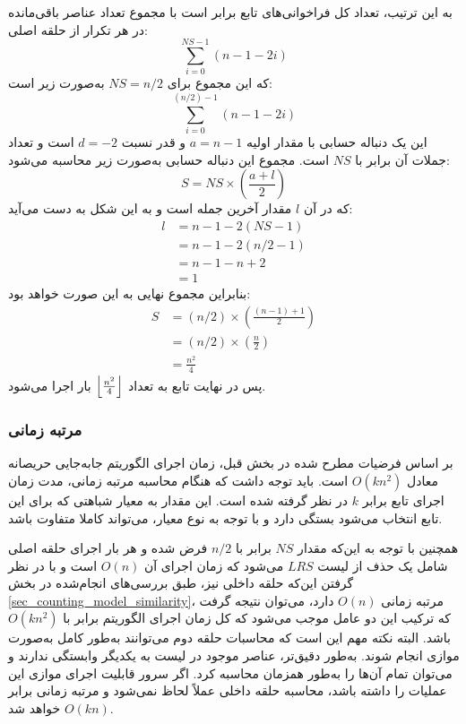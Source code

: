 به این ترتیب، تعداد کل فراخوانی‌های تابع
برابر است با مجموع تعداد عناصر باقی‌مانده در هر تکرار از حلقه اصلی:
\begin{equation}
	\sum_{i=0}^{NS-1} (n-1-2i)
\end{equation}
که این مجموع برای \( NS=n/2 \) به‌صورت زیر است:
\begin{equation}
	\sum_{i=0}^{(n/2)-1} (n-1-2i)
\end{equation}
این یک دنباله حسابی با مقدار اولیه \(a=n-1\) و قدر نسبت
 \(d=-2\) 
است و تعداد جملات آن برابر با \( NS \) است.
مجموع این دنباله حسابی به‌صورت زیر محاسبه می‌شود:
\begin{equation}
	S = NS \times \left( \frac{a+l}{2} \right)
\end{equation}
که در آن \( l \) مقدار آخرین جمله است و به این شکل به دست می‌آید:
\begin{equation}
	\begin{align*} 
		l &= n-1-2(NS-1) \\
		  &= n-1-2(n/2-1) \\
		  &= n-1-n+2 \\
		  &= 1
	\end{align*}
\end{equation}
بنابراین مجموع نهایی به این صورت خواهد بود:
\begin{equation}
	\begin{align*} 
		S &= (n/2) \times \left( \frac{(n-1)+1}{2} \right) \\
		&= (n/2) \times \left( \frac{n}{2} \right) \\
		&= \frac{n^2}{4}
	\end{align*}
\end{equation}
پس در نهایت تابع
به تعداد
\(
\left \lfloor \frac{n^2}{4} \right \rfloor
 \) 
بار اجرا می‌شود.

\vspace{3mm}
\subsubsection{مرتبه زمانی}\vspace{-1mm}\label{order_GS}
بر اساس فرضیات مطرح شده در بخش قبل، زمان اجرای الگوریتم جابه‌جایی حریصانه معادل \( O(kn^2) \) است.
باید توجه داشت که هنگام محاسبه مرتبه زمانی، مدت زمان اجرای تابع  برابر \( k \) در نظر گرفته شده است. این مقدار به معیار شباهتی که برای این تابع انتخاب می‌شود بستگی دارد و با توجه به نوع معیار، می‌تواند کاملا متفاوت باشد.


همچنین با توجه به این‌که مقدار \( NS \) برابر با \( n/2 \) فرض شده و هر بار اجرای حلقه اصلی شامل یک حذف از لیست \( LRS \) می‌شود که زمان اجرای آن \( O(n) \) است و با در نظر گرفتن این‌که حلقه داخلی نیز، طبق بررسی‌های انجام‌شده در بخش
\ref{sec_counting_model_similarity}،
مرتبه زمانی \( O(n) \) دارد، می‌توان نتیجه گرفت که ترکیب این دو عامل موجب می‌شود که کل زمان اجرای الگوریتم برابر با \( O(kn^2) \) باشد.
البته نکته مهم این است که محاسبات حلقه دوم می‌توانند به‌طور کامل به‌صورت موازی انجام شوند. به‌طور دقیق‌تر، عناصر موجود در لیست 
به یکدیگر وابستگی ندارند و می‌توان تمام آن‌ها را به‌طور همزمان محاسبه کرد. اگر سرور قابلیت اجرای موازی این عملیات را داشته باشد، محاسبه حلقه داخلی عملاً لحاظ نمی‌شود و مرتبه زمانی برابر
\( O(kn) \) 
خواهد شد. 

